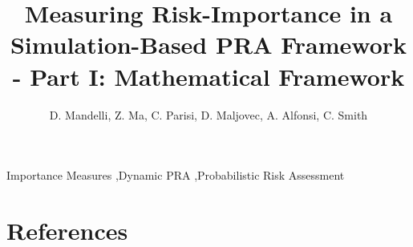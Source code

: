 \documentclass{elsarticle}
\begin{document}
\begin{frontmatter}

\title{Measuring Risk-Importance in a Simulation-Based PRA Framework - 
       Part I: Mathematical Framework}

\author{D. Mandelli, Z. Ma, C. Parisi, D. Maljovec, A. Alfonsi, C. Smith}
\address{Idaho National Laboratory (INL), 2525 Fremont Ave, 83402 Idaho Falls (ID), USA}

\begin{abstract}
  
\end{abstract}

\begin{keyword}
Importance Measures \sep Dynamic PRA \sep Probabilistic Risk Assessment 
\end{keyword}

\end{frontmatter}

\linenumbers

\printnomenclature[1in]












\section*{References}


\end{document}
